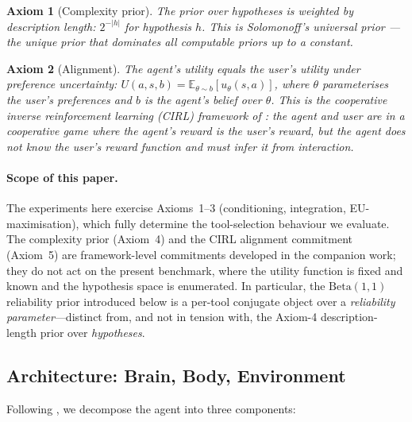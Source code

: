 \documentclass[11pt]{article}
\newcommand{\Beta}{\mathrm{Beta}}
\newcommand{\E}{\mathbb{E}}
\newtheorem{axiom}{Axiom}
\begin{document}
\begin{axiom}[Complexity prior]
The prior over hypotheses is weighted by description length: $2^{-|h|}$ for hypothesis $h$. This is Solomonoff's universal prior \citep{solomonoff1964formal}---the unique prior that dominates all computable priors up to a constant.
\end{axiom}

\begin{axiom}[Alignment]
The agent's utility equals the user's utility under preference uncertainty: $U(a, s, b) = \E_{\theta \sim b}[u_\theta(s, a)]$, where $\theta$ parameterises the user's preferences and $b$ is the agent's belief over $\theta$. This is the cooperative inverse reinforcement learning (CIRL) framework of \citet{hadfield2016cooperative}: the agent and user are in a cooperative game where the agent's reward is the user's reward, but the agent does not know the user's reward function and must infer it from interaction.
\end{axiom}

\paragraph{Scope of this paper.} The experiments here exercise Axioms~1--3 (conditioning, integration, EU-maximisation), which fully determine the tool-selection behaviour we evaluate. The complexity prior (Axiom~4) and the CIRL alignment commitment (Axiom~5) are framework-level commitments developed in the companion work; they do not act on the present benchmark, where the utility function is fixed and known and the hypothesis space is enumerated. In particular, the $\Beta(1,1)$ reliability prior introduced below is a per-tool conjugate object over a \emph{reliability parameter}---distinct from, and not in tension with, the Axiom-4 description-length prior over \emph{hypotheses}.

\subsection{Architecture: Brain, Body, Environment}
\label{sec:architecture}

Following \citet{ay2015geometric}, we decompose the agent into three components:
\end{document}
